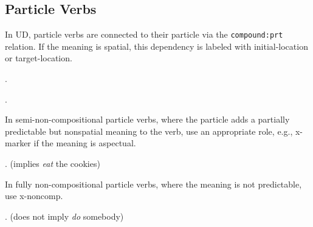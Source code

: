 \documentclass[a4paper]{article}
\newcommand{\rl}[1]{\textsf{#1}}
\begin{document}
\subsection{Particle Verbs}

In UD, particle verbs are connected to their particle via the
\texttt{compound:prt} relation. If the meaning is spatial, this dependency is
labeled with \rl{initial-location} or \rl{target-location}.

\ex.

\ex.

In semi-non-compositional particle verbs, where the particle adds a partially predictable
but nonspatial meaning to the verb, use an appropriate role, e.g.,
\rl{x-marker} if the meaning is aspectual.

\ex. (implies \emph{eat} the cookies)

In fully non-compositional particle verbs, where the meaning is not
predictable, use \rl{x-noncomp}.

\ex. (does not imply \emph{do} somebody)




\end{document}
